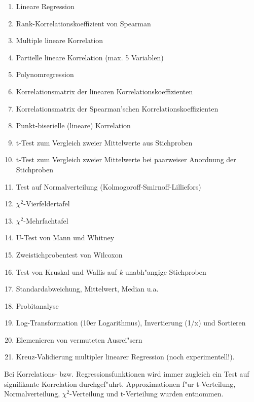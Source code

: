 \documentclass[a4paper,11pt]{article}
\begin{document}
\begin{enumerate}
\item Lineare Regression
\item Rank-Korrelationskoeffizient von {\sc Spearman} \cite[S. 175
  f\/f]{bruning77}
\item Multiple lineare Korrelation \cite[S. 77 f\/f]{mueller85}
\item Partielle lineare Korrelation (max. 5 Variablen) \cite[S. 82
  f]{weber86}
\item Polynomregression \cite[S. 65 f]{mueller85}
\item Korrelationsmatrix der linearen Korrelationskoeffizienten
\item Korrelationsmatrix der {\sc Spearman'schen} Korrelationskoeffizienten
\item Punkt-biserielle (lineare) Korrelation \cite[S. 182 f\/f]{bruning77}
\item t-Test zum Vergleich zweier Mittelwerte aus Stichproben \cite
  [S. 10 f\/f] {bruning77}
\item t-Test zum Vergleich zweier Mittelwerte bei paarweiser Anordnung
  der Stichproben \cite[S. 175 f]{weber86}
\item Test auf Normalverteilung ({\sc Kolmogoroff-Smirnoff-Lilliefors})
  \cite[S. 100 f\/f]{neave88}
\item $\chi^2$-Vierfeldertafel \cite[S. 200 f\/f]{weber86}
\item $\chi^2$-Mehrfachtafel \cite[S. 209 f\/f]{weber86}
\item U-Test von {\sc Mann} und {\sc Whitney} \cite[S. 184
  f\/f]{weber86}
\item Zweistichprobentest von {\sc Wilcoxon} \cite[S. 340 f\/f]{weber86}
\item Test von {\sc Kruskal} und {\sc Wallis} auf {\em k\/}
  unabh"angige Stichproben  \cite[S. 337 f\/f]{weber86}
\item Standardabweichung, Mittelwert, Median u.a.
\item Probitanalyse \cite[S. 534 f\/f]{weber86}
\item Log-Transformation (10er Logarithmus), Invertierung (1/x) und Sortieren
\item Elemenieren von vermuteten Ausrei"sern \cite[S. 835]{hartung86}
\item Kreuz-Validierung multipler linearer Regression (noch experimentell!).
\end{enumerate}

Bei Korrelations- bzw. Regressionsfunktionen wird immer zugleich ein
Test auf signifikante Korrelation durchgef"uhrt. Approximationen f"ur
t-Verteilung, Normalverteilung, $\chi^2$-Verteilung und
t-Verteilung wurden \cite{mueller85} entnommen.
\el
\end{document}

